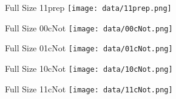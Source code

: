\documentclass{beamer}
\begin{document}
\begin{frame}{Full Size 11prep}
	\texttt{[image: data/11prep.png]}
\end{frame}

\begin{frame}{Full Size 00cNot}
	\texttt{[image: data/00cNot.png]}
\end{frame}

\begin{frame}{Full Size 01cNot}
	\texttt{[image: data/01cNot.png]}
\end{frame}

\begin{frame}{Full Size 10cNot}
	\texttt{[image: data/10cNot.png]}
\end{frame}

\begin{frame}{Full Size 11cNot}
	\texttt{[image: data/11cNot.png]}
\end{frame}
\end{document}

